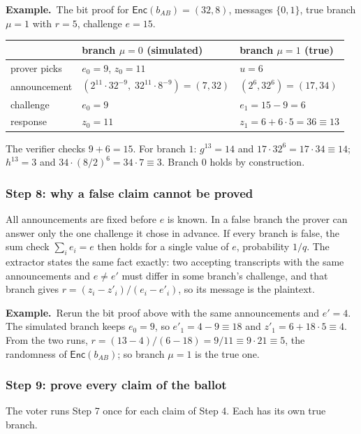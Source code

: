 \documentclass[11pt,a4paper]{article}
\newcommand{\Enc}{\mathsf{Enc}}
\newcommand{\ex}[1]{\par\medskip\noindent\textbf{Example.}~#1\par\medskip}
\theoremstyle{remark}
\begin{document}
\ex{The bit proof for $\Enc(b_{AB}) = (32, 8)$, messages $\{0, 1\}$, true
branch $\mu = 1$ with $r = 5$, challenge $e = 15$.
\begin{center}
\begin{tabular}{@{}lll@{}}
\toprule
 & branch $\mu = 0$ (simulated) & branch $\mu = 1$ (true) \\
\midrule
prover picks & $e_0 = 9$, $z_0 = 11$ & $u = 6$ \\
announcement & $(2^{11} \cdot 32^{-9},\; 32^{11} \cdot 8^{-9}) = (7, 32)$ & $(2^6, 32^6) = (17, 34)$ \\
challenge & $e_0 = 9$ & $e_1 = 15 - 9 = 6$ \\
response & $z_0 = 11$ & $z_1 = 6 + 6 \cdot 5 = 36 \equiv 13$ \\
\bottomrule
\end{tabular}
\end{center}
The verifier checks $9 + 6 = 15$. For branch $1$: $g^{13} = 14$ and $17
\cdot 32^{6} = 17 \cdot 34 \equiv 14$; $h^{13} = 3$ and $34 \cdot (8 /
2)^{6} = 34 \cdot 7 \equiv 3$. Branch $0$ holds by construction.}

\subsubsection*{Step 8: why a false claim cannot be proved}
All announcements are fixed before $e$ is known. In a false branch the
prover can answer only the one challenge it chose in advance. If every
branch is false, the sum check $\sum_i e_i = e$ then holds for a single
value of $e$, probability $1/q$. The extractor states the same fact
exactly: two accepting transcripts with the same announcements and $e \ne
e'$ must differ in some branch's challenge, and that branch gives $r =
(z_i - z'_i) / (e_i - e'_i)$, so its message is the plaintext.

\ex{Rerun the bit proof above with the same announcements and $e' = 4$.
The simulated branch keeps $e_0 = 9$, so $e'_1 = 4 - 9 \equiv 18$ and
$z'_1 = 6 + 18 \cdot 5 \equiv 4$. From the two runs, $r = (13 - 4)/(6 -
18) = 9 / 11 \equiv 9 \cdot 21 \equiv 5$, the randomness of $\Enc(b_{AB})$;
so branch $\mu = 1$ is the true one.}

\subsubsection*{Step 9: prove every claim of the ballot}
The voter runs Step 7 once for each claim of Step 4. Each has its own true
branch.
\end{document}
